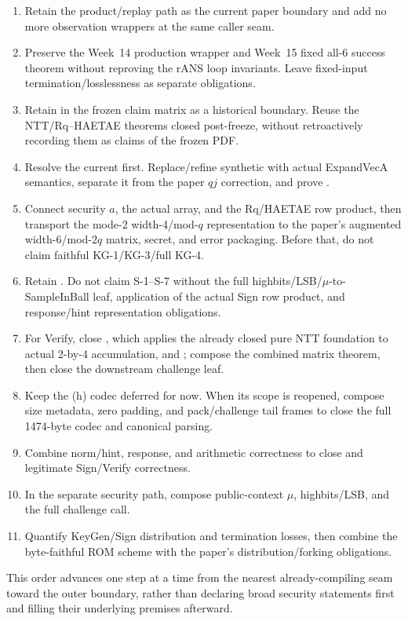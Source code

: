 \begin{enumerate}
  \item Retain the product/replay path as the current paper boundary and add no
        more observation wrappers at the same caller seam.
  \item Preserve the Week~14 production wrapper and Week~15 fixed all-6 success
        theorem without reproving the rANS loop invariants. Leave fixed-input
        termination/losslessness as separate obligations.
  \item Retain  in the frozen claim matrix as a historical
        boundary. Reuse the NTT/Rq--HAETAE theorems closed post-freeze, without
        retroactively recording them as claims of the frozen PDF.
  \item Resolve the current  first. Replace/refine
        synthetic  with actual ExpandVecA
        semantics, separate it from the paper \(qj\) correction, and prove
        .
  \item Connect security \(a\), the actual array, and the Rq/HAETAE row product,
        then transport the mode-2 width-4/mod-\(q\) representation to the paper's
        augmented width-6/mod-\(2q\) matrix, secret, and error packaging. Before
        that, do not claim faithful KG-1/KG-3/full KG-4.
  \item Retain . Do not claim S-1--S-7 without
        the full highbits/LSB/\(\mu\)-to-SampleInBall leaf, application of the
        actual Sign row product, and response/hint representation obligations.
  \item For Verify, close \allowbreak
        , which applies the already closed pure
        NTT foundation to actual 2-by-4 accumulation, and
        ; compose the combined
        matrix theorem, then close the downstream challenge leaf.
  \item Keep the (h) codec deferred for now. When its scope is reopened, compose
        size metadata, zero padding, and pack/challenge tail frames to close the
        full 1474-byte codec and canonical parsing.
  \item Combine norm/hint, response, and arithmetic correctness to close
         and legitimate Sign/Verify correctness.
  \item In the separate security path, compose public-context \(\mu\),
        highbits/LSB, and the full challenge call.
  \item Quantify KeyGen/Sign distribution and termination losses, then combine
        the byte-faithful ROM scheme with the paper's distribution/forking obligations.
\end{enumerate}

This order advances one step at a time from the nearest already-compiling seam
toward the outer boundary, rather than declaring broad security statements first
and filling their underlying premises afterward.
